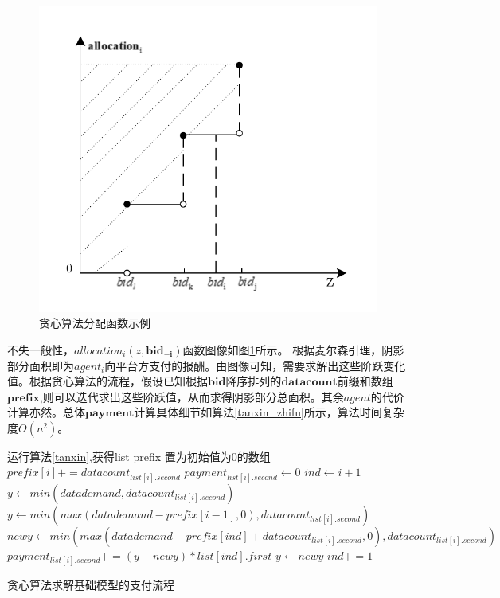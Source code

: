 \documentclass[promaster]{thesis-uestc}
\begin{document}
\begin{figure}[h]
    \includegraphics[width=350pt]{pic/tanxin_allocation.pdf}
    \caption{贪心算法分配函数示例}
    \label{tanxin_allocation}
\end{figure}

不失一般性，$allocation_i(z,\mathbf{bid_{-i}})$函数图像如图\ref{tanxin_allocation}所示。
根据麦尔森引理，阴影部分面积即为$agent_i$向平台方支付的报酬。由图像可知，需要求解出这些阶跃变化值。根据贪心算法的流程，假设已知根据$\mathbf{bid}$降序排列的$\mathbf{datacount}$前缀和数组$\mathbf{prefix}$,则可以迭代求出这些阶跃值，从而求得阴影部分总面积。其余$agent$的代价计算亦然。总体$\mathbf{payment}$计算具体细节如算法\ref{tanxin_zhifu}所示，算法时间复杂度$O(n^2)$。

\begin{algorithm}[H]
    运行算法\ref{tanxin},获得list\;
    prefix 置为初始值为0的数组\;
    {
        $prefix[i]  += datacount_{list[i].second}$\;
    }
    {
        $payment_{list[i].second} \leftarrow 0$\;
        $ind \leftarrow i + 1$
        {
            $y \leftarrow min(datademand,datacount_{list[i].second})$\;
        }{
        $y \leftarrow min(max(datademand - prefix[i-1],0),datacount_{list[i].second})$\;
        }
        {
            $newy \leftarrow min(max(datademand - prefix[ind]+ datacount_{list[i].second},0),datacount_{list[i].second})$\;
            $payment_{list[i].second} += (y - newy)*list[ind].first$\;
            $y \leftarrow newy$\;
            $ind += 1$\;
        }
    }
\caption{贪心算法求解基础模型的支付流程}
\label{tanxin_zhifu}
\end{algorithm}
\end{document}
